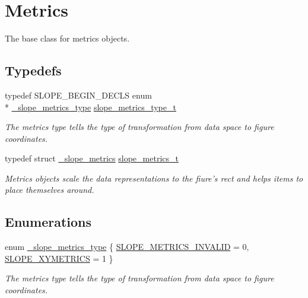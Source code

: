 \hypertarget{group__Metrics}{\section{Metrics}
\label{group__Metrics}
}


The base class for metrics objects.  


\subsection*{Typedefs}
\begin{DoxyCompactItemize}
\item 
typedef S\+L\+O\+P\+E\+\_\+\+B\+E\+G\+I\+N\+\_\+\+D\+E\+C\+L\+S enum \\*
\hyperlink{group__Metrics_gafd1cecb864b09319525ee096fc692dd4}{\+\_\+slope\+\_\+metrics\+\_\+type} \hyperlink{group__Metrics_ga5f51fc24807a4b3d2b0d41f354bbcedf}{slope\+\_\+metrics\+\_\+type\+\_\+t}
\begin{DoxyCompactList}\small\item\em The metrics type tells the type of transformation from data space to figure coordinates. \end{DoxyCompactList}\item 
\hypertarget{group__Metrics_gab80787ee8ae8dc449e770249fe0e3c35}{typedef struct \hyperlink{struct__slope__metrics}{\+\_\+slope\+\_\+metrics} \hyperlink{group__Metrics_gab80787ee8ae8dc449e770249fe0e3c35}{slope\+\_\+metrics\+\_\+t}}\label{group__Metrics_gab80787ee8ae8dc449e770249fe0e3c35}

\begin{DoxyCompactList}\small\item\em Metrics objects scale the data representations to the fiure's rect and helps items to place themselves around. \end{DoxyCompactList}\end{DoxyCompactItemize}
\subsection*{Enumerations}
\begin{DoxyCompactItemize}
\item 
enum \hyperlink{group__Metrics_gafd1cecb864b09319525ee096fc692dd4}{\+\_\+slope\+\_\+metrics\+\_\+type} \{ \hyperlink{group__Metrics_ggafd1cecb864b09319525ee096fc692dd4ad8bd15dd877a322c323826524fad1d7b}{S\+L\+O\+P\+E\+\_\+\+M\+E\+T\+R\+I\+C\+S\+\_\+\+I\+N\+V\+A\+L\+I\+D} = 0, 
\hyperlink{group__Metrics_ggafd1cecb864b09319525ee096fc692dd4a8054bd0c50ca93d0b3222b70b1284c37}{S\+L\+O\+P\+E\+\_\+\+X\+Y\+M\+E\+T\+R\+I\+C\+S} = 1
 \}
\begin{DoxyCompactList}\small\item\em The metrics type tells the type of transformation from data space to figure coordinates. \end{DoxyCompactList}\end{DoxyCompactItemize}
